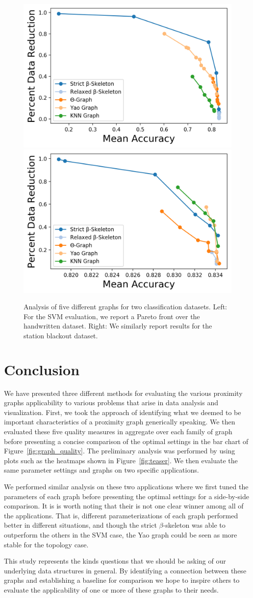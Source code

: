\begin{figure}[htbp]
    \centering
    \includegraphics[width=0.48\linewidth]{figs/chap7/pareto_letters.png}
    \includegraphics[width=0.48\linewidth]{figs/chap7/pareto_sbo.png}
    \caption{Analysis of five different graphs for two classification datasets.
    Left: For the SVM evaluation, we report a Pareto front over the handwritten dataset.
    Right: We similarly report results for the station blackout dataset.}
    \label{fig:graph_svm}
\end{figure}

\section{Conclusion}
We have presented three different methods for evaluating the various proximity graphs applicability to various problems that arise in data analysis and visualization.
%
First, we took the approach of identifying what we deemed to be important characteristics of a proximity graph generically speaking.
%
We then evaluated these five quality measures in aggregate over each family of graph before presenting a concise comparison of the optimal settings in the bar chart of Figure~\ref{fig:graph_quality}.
%
The preliminary analysis was performed by using plots such as the heatmaps shown in Figure~\ref{fig:teaser}.
%
We then evaluate the same parameter settings and graphs on two specific applications.

We performed similar analysis on these two applications where we first tuned the parameters of each graph before presenting the optimal settings for a side-by-side comparison.
%
It is is worth noting that their is not one clear winner among all of the applications.
%
That is, different parameterizations of each graph performed better in different situations, and though the strict $\beta$-skeleton was able to outperform the others in the SVM case, the Yao graph could be seen as more stable for the topology case.

This study represents the kinds questions that we should be asking of our underlying data structures in general.
%
By identifying a connection between these graphs and establishing a baseline for comparison we hope to inspire others to evaluate the applicability of one or more of these graphs to their needs.